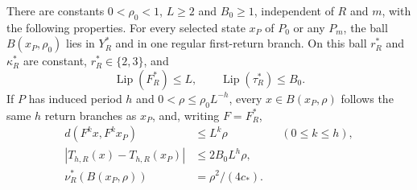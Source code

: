 \begin{lemma}
\label{lem:uniform-period-tubes}
There are constants $0<\rho_0<1$, $L\ge2$ and $B_0\ge1$, independent
of $R$ and $m$, with the following properties. For every selected
state $x_P$ of $P_0$ or any $P_m$, the ball $B(x_P,\rho_0)$ lies
in $Y_R^*$ and in one regular first-return branch. On this ball
$r_R^*$ and $\kappa_R^*$ are constant, $r_R^*\in\{2,3\}$, and
\[
 \operatorname{Lip}(F_R^*)\le L,\qquad
 \operatorname{Lip}(\tau_R^*)\le B_0.
\]
If $P$ has induced period $h$ and $0<\rho\le\rho_0L^{-h}$, every
$x\in B(x_P,\rho)$ follows the same $h$ return branches as $x_P$,
and, writing $F=F_R^*$,
\begin{align}\label{eq:period-tube-bounds}
 d(F^k x,F^k x_P)&\le L^k\rho &&(0\le k\le h),\\
 |T_{h,R}(x)-T_{h,R}(x_P)|&\le2B_0L^h\rho,\\
 \nu_R^*(B(x_P,\rho))&=\rho^2/(4c_*).
\end{align}
\end{lemma}
